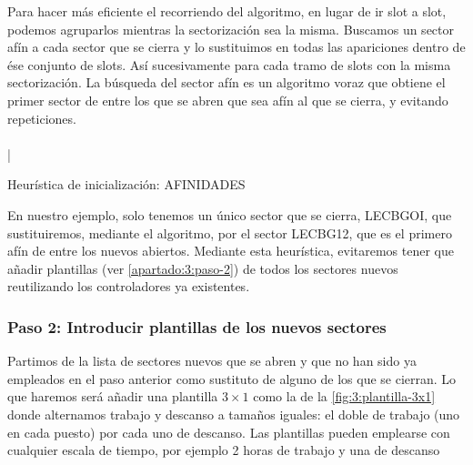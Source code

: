 Para hacer más eficiente el recorriendo del algoritmo, en lugar de ir slot a slot, podemos agruparlos mientras la sectorización sea la misma. Buscamos un sector afín a cada sector que se cierra y lo sustituimos en todas las apariciones dentro de ése conjunto de slots. Así sucesivamente para cada tramo de slots con la misma sectorización. 
La búsqueda del sector afín es un algoritmo voraz que obtiene el primer sector de entre los que se abren que sea afín al que se cierra, y evitando repeticiones.
\\
\\|
\begin{algorithm}[H]
	\DontPrintSemicolon
	\medskip
	
	
	\caption{Heurística de inicialización: AFINIDADES}
\end{algorithm}


En nuestro ejemplo, solo tenemos un único sector que se cierra, LECBGOI, que sustituiremos, mediante el algoritmo, por el sector LECBG12, que es el primero afín de entre los nuevos abiertos. Mediante esta heurística, evitaremos tener que añadir plantillas (ver \autoref{apartado:3:paso-2}) de todos los sectores nuevos reutilizando los controladores ya existentes.

\subsubsection{Paso 2: Introducir plantillas de los nuevos sectores} \label{apartado:3:paso-2}

Partimos de la lista de sectores nuevos que se abren y que no han sido ya empleados en el paso anterior como sustituto de alguno de los que se cierran. Lo que haremos será añadir una plantilla $3\times1$ como la de la 
\autoref{fig:3:plantilla-3x1} donde alternamos trabajo y descanso a tamaños iguales: el doble de trabajo (uno en cada puesto) por cada uno de descanso. Las plantillas pueden emplearse con cualquier escala de tiempo, por ejemplo 2 horas de trabajo y una de descanso

